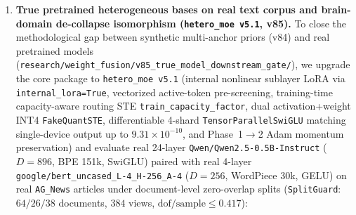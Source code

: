 \documentclass[10pt,twoside]{article}
\theoremstyle{definition}
\theoremstyle{plain}
\theoremstyle{remark}
\begin{document}
\begin{enumerate}[leftmargin=1.6em, itemsep=1pt, parsep=0pt]
    \begin{itemize}[leftmargin=1.4em, itemsep=0.5pt, parsep=0pt]
        \item \emph{Classification ($N{=}900$, 64 pretrained domain anchors):} \texttt{v5} reaches held-out test accuracy $\mathbf{0.9111}$, outperforming frozen 2-expert \texttt{v4} ($0.5889$, $+32.22\,\text{pp}$, $p{=}0.0$) and every single-expert no-fusion arm: \texttt{single\_trainable\_fullinput\_nofusion} ($0.4778$, $+43.33\,\text{pp}$), \texttt{frozen\_silu} ($0.4056$), \texttt{frozen\_gelu} ($0.3000$), \texttt{single\_frozen\_fullinput\_lora6} ($0.2722$), and \texttt{single\_frozen\_fullinput\_headonly} ($0.2611$).
        \item \emph{Sequence language modeling ($480 \times 16$ tokens, 8 pretrained morphological variants):} \texttt{v5} achieves held-out test perplexity $\mathbf{4.259}$, a $\mathbf{47.1\%}$ reduction over the best single expert ($8.054$), while single-expert no-fusion baselines without pretrained specialist priors remain at $\mathrm{PPL}=15.300$ (\texttt{single\_lora4}) and $15.347$ (\texttt{single\_trainable}).
    \end{itemize}
    \item \textbf{True pretrained heterogeneous bases on real text corpus and brain-domain de-collapse isomorphism (\texttt{hetero\_moe v5.1}, v85).} To close the methodological gap between synthetic multi-anchor priors (v84) and real pretrained models (\texttt{research/weight\_fusion/v85\_true\_model\_downstream\_gate/}), we upgrade the core package to \texttt{hetero\_moe v5.1} (internal nonlinear sublayer LoRA via \texttt{internal\_lora=True}, vectorized active-token pre-screening, training-time capacity-aware routing STE \texttt{train\_capacity\_factor}, dual activation+weight INT4 \texttt{FakeQuantSTE}, differentiable 4-shard \texttt{TensorParallelSwiGLU} matching single-device output up to $9.31\times 10^{-10}$, and Phase~1$\to$2 Adam momentum preservation) and evaluate real 24-layer \texttt{Qwen/Qwen2.5-0.5B-Instruct} ($D{=}896$, BPE 151k, SwiGLU) paired with real 4-layer \texttt{google/bert\_uncased\_L-4\_H-256\_A-4} ($D{=}256$, WordPiece 30k, GELU) on real \texttt{AG\_News} articles under document-level zero-overlap splits (\texttt{SplitGuard}: $64/26/38$ documents, $384$ views, $\text{dof/sample}\le 0.417$):
    \begin{itemize}[leftmargin=1.4em, itemsep=0.5pt, parsep=0pt]

\end{itemize}
\end{enumerate}
\end{document}
